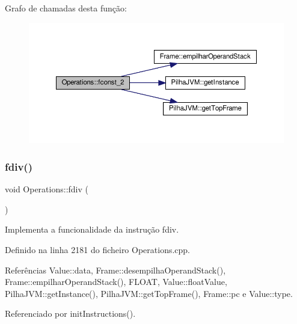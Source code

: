 Grafo de chamadas desta função\+:\nopagebreak
\begin{figure}[H]
\begin{center}
\leavevmode
\includegraphics[width=350pt]{classOperations_a1857c1a0e34d6f91dcb7166ca6d678a2_cgraph}
\end{center}
\end{figure}
\mbox{\label{classOperations_a85d79532189d640a6d02c99f204d2229}} 
\subsubsection{\texorpdfstring{fdiv()}{fdiv()}}
{\footnotesize\ttfamily void Operations\+::fdiv (\begin{DoxyParamCaption}{ }\end{DoxyParamCaption})\hspace{0.3cm}{\ttfamily [private]}}



Implementa a funcionalidade da instrução fdiv. 



Definido na linha 2181 do ficheiro Operations.\+cpp.



Referências Value\+::data, Frame\+::desempilha\+Operand\+Stack(), Frame\+::empilhar\+Operand\+Stack(), F\+L\+O\+AT, Value\+::float\+Value, Pilha\+J\+V\+M\+::get\+Instance(), Pilha\+J\+V\+M\+::get\+Top\+Frame(), Frame\+::pc e Value\+::type.



Referenciado por init\+Instructions().

